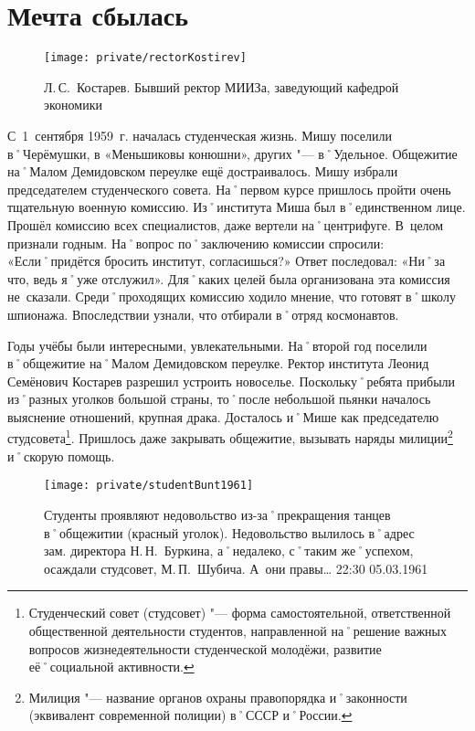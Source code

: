 ﻿\chapter{Мечта сбылась}

\begin{wrapfigure}{O}{.4\textwidth}
\centering
\texttt{[image: private/rectorKostirev]}
\caption[Л.\,С.~Костарев. Бывший ректор МИИЗа, заведующий кафедрой экономики]{Л.\,С.~Костарев. Бывший ректор МИИЗа, заведующий кафедрой экономики\footnotemark}
\label{fig:rectorKostirev}
\end{wrapfigure}

С~1~сентября 1959~г. началась студенческая жизнь. Мишу поселили в˚Черёмушки, в «Меньшиковы конюшни», других "--- в˚Удельное. Общежитие на˚Малом Демидовском переулке ещё достраивалось. Мишу избрали председателем студенческого совета. На˚первом курсе пришлось пройти очень тщательную военную комиссию. Из˚института Миша был в˚единственном лице. Прошёл комиссию всех специалистов, даже вертели на˚центрифуге. В~целом признали годным. На˚вопрос по˚заключению комиссии спросили: «Если˚придётся бросить институт, согласишься?» Ответ последовал: «Ни˚за что, ведь я˚уже отслужил». Для˚каких целей была организована эта комиссия не~сказали. Среди˚проходящих комиссию ходило мнение, что готовят в˚школу шпионажа. Впоследствии узнали, что отбирали в˚отряд космонавтов.

Годы учёбы были интересными, увлекательными. На˚второй год поселили в˚общежитие на˚Малом Демидовском переулке. Ректор института Леонид Семёнович Костарев разрешил устроить новоселье. Поскольку˚ребята прибыли из˚разных уголков большой страны, то˚после небольшой пьянки началось выяснение отношений, крупная драка. Досталось и˚Мише как председателю студсовета\footnote{Студенческий совет (студсовет) "--- форма самостоятельной, ответственной общественной деятельности студентов, направленной на˚решение важных вопросов жизнедеятельности студенческой молодёжи, развитие её˚социальной активности.}. Пришлось даже закрывать общежитие, вызывать наряды милиции\footnote{Милиция "--- название органов охраны правопорядка и˚законности (эквивалент современной полиции) в˚СССР и˚России.} и˚скорую помощь.

\begin{figure}[h]
\texttt{[image: private/studentBunt1961]}
\caption[Студенты проявляют недовольство из-за˚прекращения танцев в˚общежитии (красный уголок). Недовольство вылилось в˚адрес зам. директора Н.\,Н.~Буркина, а˚недалеко, с˚таким же˚успехом, осаждали студсовет, М.\,П.~Шубича. А~они правы… 22:30 05.03.1961]{Студенты проявляют недовольство из-за˚прекращения танцев в˚общежитии (красный уголок). Недовольство вылилось в˚адрес зам. директора Н.\,Н.~Буркина, а˚недалеко, с˚таким же˚успехом, осаждали студсовет, М.\,П.~Шубича. А~они правы… 22:30 05.03.1961\footnotemark}
\label{fig:studentBunt1961}
\end{figure}

